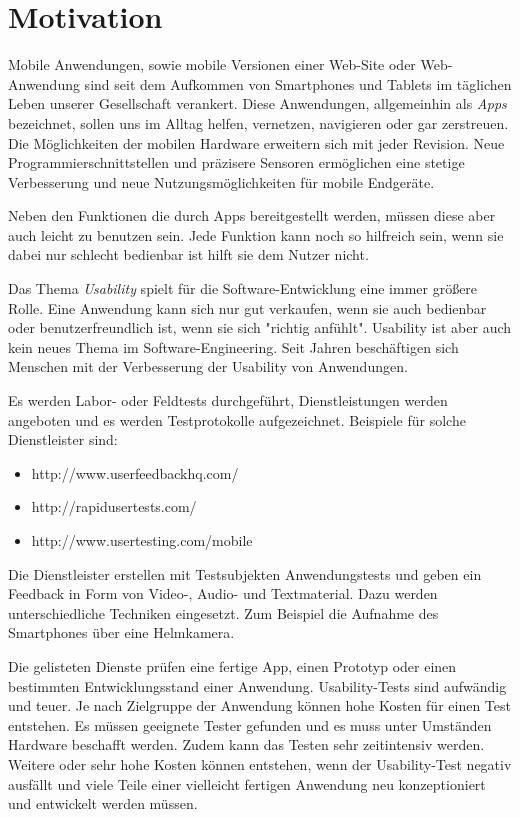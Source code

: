 \section{Motivation}
\label{motivation}

Mobile Anwendungen, sowie mobile Versionen einer Web-Site oder Web-Anwendung sind seit dem Aufkommen von Smartphones und Tablets im täglichen Leben unserer Gesellschaft verankert. Diese Anwendungen, allgemeinhin als \textit{Apps} bezeichnet, sollen uns im Alltag helfen, vernetzen, navigieren oder gar zerstreuen. Die Möglichkeiten der mobilen Hardware erweitern sich mit jeder Revision. Neue Programmierschnittstellen und präzisere Sensoren ermöglichen eine stetige Verbesserung und neue Nutzungsmöglichkeiten für mobile Endgeräte. 

Neben den Funktionen die durch Apps bereitgestellt werden, müssen diese aber auch leicht zu benutzen sein. Jede Funktion kann noch so hilfreich sein, wenn sie dabei nur schlecht bedienbar ist hilft sie dem Nutzer nicht.

Das Thema \textit{Usability} spielt für die Software-Entwicklung eine immer größere Rolle. Eine Anwendung kann sich nur gut verkaufen, wenn sie auch bedienbar oder benutzerfreundlich ist, wenn sie sich "richtig anfühlt". Usability ist aber auch kein neues Thema im Software-Engineering. Seit Jahren beschäftigen sich Menschen mit der Verbesserung der Usability von Anwendungen.

Es werden Labor- oder Feldtests durchgeführt, Dienstleistungen werden angeboten und es werden Testprotokolle aufgezeichnet. Beispiele für solche Dienstleister sind: 

\begin{itemize}
    \item{http://www.userfeedbackhq.com/}
    \item{http://rapidusertests.com/}
    \item{http://www.usertesting.com/mobile}
\end{itemize}

Die Dienstleister erstellen mit Testsubjekten Anwendungstests und geben ein Feedback in Form von Video-, Audio- und Textmaterial. Dazu werden unterschiedliche Techniken eingesetzt. Zum Beispiel die Aufnahme des Smartphones über eine Helmkamera. 

Die gelisteten Dienste prüfen eine fertige App, einen Prototyp oder einen bestimmten Entwicklungsstand einer Anwendung. Usability-Tests sind aufwändig und teuer. Je nach Zielgruppe der Anwendung können hohe Kosten für einen Test entstehen. Es müssen geeignete Tester gefunden und es muss unter Umständen Hardware beschafft werden. Zudem kann das Testen sehr zeitintensiv werden. Weitere oder sehr hohe Kosten können entstehen, wenn der Usability-Test negativ ausfällt und viele Teile einer vielleicht fertigen Anwendung neu konzeptioniert und entwickelt werden müssen. 

